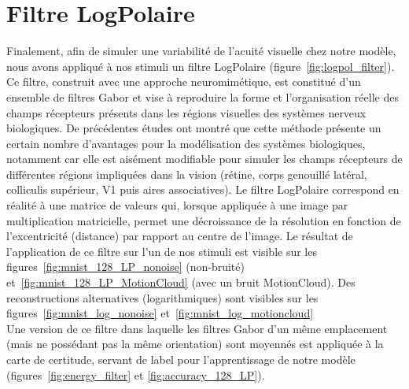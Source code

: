 \section{Filtre LogPolaire}
Finalement, afin de simuler une variabilité de l'acuité visuelle chez notre modèle, nous avons appliqué à nos stimuli un filtre LogPolaire (figure~\ref{fig:logpol_filter}).
Ce filtre, construit avec une approche neuromimétique, est constitué d'un ensemble de filtres Gabor et vise à reproduire la forme et l'organisation réelle des champs récepteurs présents dans les régions visuelles des systèmes nerveux biologiques. 
De précédentes études ont montré que cette méthode présente un certain nombre d'avantages pour la modélisation des systèmes biologiques, notamment car elle est aisément modifiable pour simuler les champs récepteurs de différentes régions impliquées dans la vision (rétine, corps genouillé latéral, colliculis supérieur, V1 puis aires associatives).
Le filtre LogPolaire correspond en réalité à une matrice de valeurs qui, lorsque appliquée à une image par multiplication matricielle, permet une décroissance de la résolution en fonction de l'excentricité (distance) par rapport au centre de l'image. 
Le résultat de l'application de ce filtre sur l'un de nos stimuli est visible sur les figures~\ref{fig:mnist_128_LP_nonoise} (non-bruité) et~\ref{fig:mnist_128_LP_MotionCloud} (avec un bruit MotionCloud). Des reconstructions alternatives (logarithmiques) sont visibles sur les figures~\ref{fig:mnist_log_nonoise} et~\ref{fig:mnist_log_motioncloud} \autocite{Freeman2011} \\
Une version de ce filtre dans laquelle les filtres Gabor d'un même emplacement (mais ne possédant pas la même orientation) sont moyennés est appliquée à la carte de certitude, servant de label pour l'apprentissage de notre modèle (figures~\ref{fig:energy_filter} et \ref{fig:accuracy_128_LP}).

